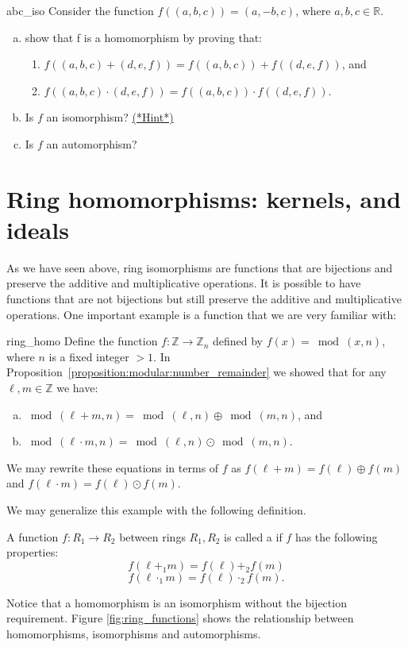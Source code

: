 \begin{exercise}{abc_iso}
Consider the function $f((a,b,c))=(a,-b,c)$, where $a,b,c\in{\mathbb R}$.
\begin{enumerate}[(a)]
\item show that f is a homomorphism by proving that:
\begin{enumerate}[(1)]
\item $f((a,b,c)+(d,e,f))=f((a,b,c))+f((d,e,f))$, and 
\item $f((a,b,c)\cdot(d,e,f))=f((a,b,c))\cdot f((d,e,f))$.
\end{enumerate}
\item Is $f$ an isomorphism? \hyperref[ringsHints]{(*Hint*)} 
\item Is $f$ an automorphism?
\end{enumerate}
\end{exercise}

\section{Ring homomorphisms: kernels, and ideals}
\label{sec:Rings:RingHomomorphismKernelsIdeals}

As we have seen above, ring isomorphisms are functions that are bijections and preserve the additive and multiplicative operations. It is possible to have functions that are not bijections but still preserve the additive and multiplicative operations.  One important example is a function that we are very familiar with: 

\begin{example}{ring_homo}
Define the function $f:{\mathbb Z}\rightarrow {\mathbb Z}_n$ defined by $f(x)=\bmod(x,n)$, where $n$ is a fixed integer $> 1$.  In Proposition~\ref{proposition:modular:number_remainder} we showed that for any $\ell,m \in {\mathbb Z}$ we have:
\begin{enumerate}[(a)]
\item
$\bmod(\ell+ m,n) = \bmod(\ell,n) \oplus \bmod(m,n)$, 
and
\item
$\bmod(\ell \cdot m,n) = \bmod(\ell,n) \odot \bmod(m,n)$.
\end{enumerate}
We may rewrite these equations in terms of $f$ as $f(\ell+ m) = f(\ell) \oplus f(m)$ and $f(\ell\cdot m) = f(\ell) \odot f(m)$. 
\end{example}
We may generalize this example with the following definition.

\begin{defn}\label{homomorph}
A function $f:R_1\rightarrow R_2$ between rings $R_1,R_2$ is called a  if $f$ has the following properties:
\begin{equation}\label{eq:homo_add}
f(\ell+_1 m) = f(\ell) +_2 f(m)
\end{equation} 
\begin{equation}\label{eq:homo_mult}
f(\ell\cdot_1 m) = f(\ell) \cdot_2 f(m).
\end{equation}
\end{defn}
Notice that a homomorphism is an isomorphism without the bijection requirement.  Figure \ref{fig:ring_functions} shows the relationship between homomorphisms, isomorphisms and automorphisms.

